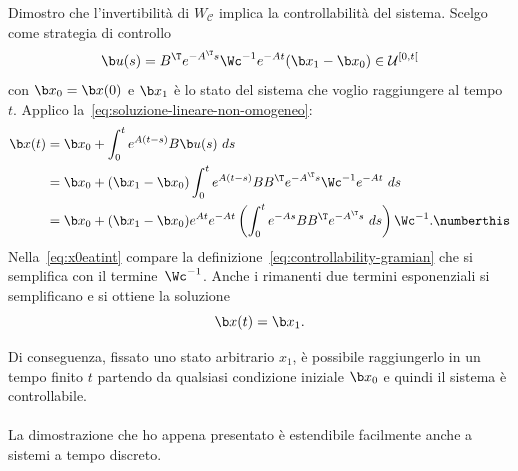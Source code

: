 \begin{steps}
    \item Dimostro che l'invertibilità di $W_{\mathcal C}$ implica la controllabilità del sistema.
    Scelgo come strategia di controllo
    \begin{equation*}
        \b u(s) = B^\T e^{-A^\T s} \Wc^{-1} e^{-At} (\b x_1 - \b x_0) \in \mathcal U^{[0, t[}
    \end{equation*}
    con $\b x_0 = \b x(0)$ e $\b x_1$ è lo stato del sistema che voglio raggiungere al tempo $t$.
    Applico la~\eqref{eq:soluzione-lineare-non-omogeneo}:
    \begin{align*}
        \b x(t) &= \b x_0+ \int_0^t e^{A(t-s)} B \b u(s)\ ds \\
                &= \b x_0 + (\b x_1 - \b x_0) \int_0^t e^{A(t-s)} B B^\T e^{-A^\T s} \Wc^{-1} e^{-At}\ ds \\
                &= \b x_0 + (\b x_1 - \b x_0) e^{At} e^{-At} \left(\int_0^t e^{-As} B B^\T e^{-A^\T s}\ ds \right)\Wc^{-1}. \numberthis \label{eq:x0eatint}
    \end{align*}
    Nella~\eqref{eq:x0eatint} compare la definizione~\eqref{eq:controllability-gramian}
    che si semplifica con il termine~$\Wc^{-1}$.
    Anche i rimanenti due termini esponenziali si semplificano e si ottiene la soluzione
    \begin{equation*}
        \b x(t) = \b x_1.
    \end{equation*}
\end{steps}
Di conseguenza, fissato uno stato arbitrario $x_1$, è possibile raggiungerlo in un tempo finito $t$
partendo da qualsiasi condizione iniziale $\b x_0$ e quindi il sistema è controllabile.
\hfill\qedsymbol \paragraph{}

La dimostrazione che ho appena presentato è estendibile facilmente anche a
sistemi a tempo discreto.

